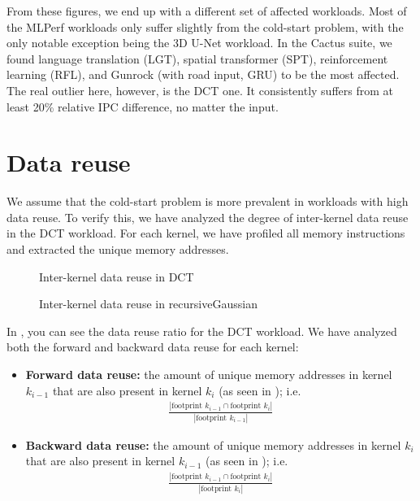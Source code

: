 From these figures, we end up with a different set of affected workloads.
Most of the MLPerf workloads only suffer slightly from the cold-start problem, with the only notable exception being the 3D U-Net workload.
In the Cactus suite, we found language translation (LGT), spatial transformer (SPT), reinforcement learning (RFL), and Gunrock (with road input, GRU) to be the most affected.
The real outlier here, however, is the DCT one.
It consistently suffers from at least 20\% relative IPC difference, no matter the input.

\FloatBarrier

\section{Data reuse}\label{sec:data-reuse}
We assume that the cold-start problem is more prevalent in workloads with high data reuse.
To verify this, we have analyzed the degree of inter-kernel data reuse in the DCT workload.
For each kernel, we have profiled all memory instructions and extracted the unique memory addresses.

\begin{figure}[htb]
    \centering
    \caption{Inter-kernel data reuse in DCT}
    \label{fig:dct_reuse}
\end{figure}

\begin{figure}[hbt]
    \centering
    \caption{Inter-kernel data reuse in recursiveGaussian}
    \label{fig:recg_reuse}
\end{figure}

In , you can see the data reuse ratio for the DCT workload.
We have analyzed both the forward and backward data reuse for each kernel:
\begin{itemize}
    \item \textbf{Forward data reuse:} the amount of unique memory addresses in kernel $k_{i-1}$ that are also present in kernel $k_{i}$ (as seen in ); i.e.
    \begin{align}
        \frac{|\text{footprint } k_{i-1} \cap \text{footprint } k_i|}{|\text{footprint } k_{i-1}|}
    \end{align}
    \item \textbf{Backward data reuse:} the amount of unique memory addresses in kernel $k_{i}$ that are also present in kernel $k_{i-1}$ (as seen in ); i.e.
    \begin{align}
        \frac{|\text{footprint } k_{i-1} \cap \text{footprint } k_i|}{|\text{footprint } k_i|}
    \end{align}
\end{itemize}

